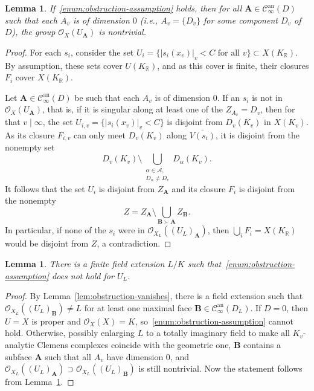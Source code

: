 \documentclass[a4paper, twoside, 10pt]{amsart}
\newcommand{\uA}{{\boldsymbol{A}}}
\newcommand{\uB}{{\boldsymbol{B}}}
\newcommand{\cA}{\mathcal{A}}
\newcommand{\cC}{\mathcal{C}}
\newcommand{\cO}{\mathcal{O}}
\newcommand{\RR}{\mathbb{R}}
\newcommand{\Can}{\cC^{\mathrm{an}}}
\newcommand{\abs}[1]{\left\lvert#1\right\rvert}
\newtheorem{lemma}[theorem]{Lemma}
\theoremstyle{definition}
\begin{document}
\begin{lemma}\label{lem:O-implies-1-dim-obs}
  If~\ref{enum:obstruction-assumption} holds, then for all $\uA\in \Can_\infty(D)$ such that each $A_v$ is of dimension $0$ (i.e., $A_v =\{D_v\}$ for some component $D_v$ of $D$), the group $\cO_{X}(U_{\uA})$ is nontrivial.
\end{lemma}
\begin{proof}
  For each $s_i$, consider the set $U_i = \{\abs{s_i(x_v)}_v < C \text{ for all $v$}\} \subset X(K_\RR)$. By assumption, these sets cover $U(K_\RR)$, and as this cover is finite, their closures $F_i$ cover $X(K_\RR)$.

  Let $\uA\in\Can_\infty(D)$ be such that each $A_v$ is of dimension $0$.
  If an $s_i$ is not in $\cO_{X}(U_{\uA})$, that is, if it is singular along at least one of the $Z_{A_v} = D_v$, then for that $v\mid\infty$,  the set
  $U_{i,v} = \{\abs{s_i(x_v)}_v < C\}$ is disjoint from $D_v(K_v)$ in $X(K_v)$. As its closure $F_{i,v}$ can only meet $D_v(K_v)$ along $\overline{V(s_i)}$, it is disjoint from the nonempty set
  \[
    D_v(K_v)\setminus \bigcup_{\substack{\alpha\in\cA,\\ D_\alpha \ne D_v}} D_\alpha(K_v).
  \]
  It follows that the set $U_i$ is disjoint from $Z_\uA$ and its closure $F_i$ is disjoint from the nonempty
  \[
    Z = Z_\uA \setminus \bigcup_{\uB\succ \uA} Z_\uB.
  \]
  In particular, if none of the $s_i$ were in $\cO_{X_L}((U_L)_{\uA})$, then $\bigcup_i F_i = X(K_\RR)$ would be disjoint from $Z$, a contradiction.
\end{proof}

\begin{lemma}
  There is a finite field extension $L/K$ such that~\ref{enum:obstruction-assumption} does not hold for $U_L$.
\end{lemma}
\begin{proof}
  By Lemma~\ref{lem:obstruction-vanishes}, there is a field extension such that $\cO_{X_L}((U_L)_{\uB}) \ne L$ for at least one maximal face $\uB\in\Can_\infty(D_L)$. 
  If $D=0$, then $U=X$ is proper and $\cO_X(X)=K$, so~\ref{enum:obstruction-assumption} cannot hold. Otherwise, possibly enlarging $L$ to a totally imaginary field to make all $K_v$-analytic Clemens complexes coincide with the geometric one, $\uB$ contains a subface $\uA$ such that all $A_v$ have dimension $0$, and $\cO_{X_L}((U_L)_\uA)\supset \cO_{X_L}((U_L)_\uB)$ is still nontrivial.
  Now the statement follows from Lemma~\ref{lem:O-implies-1-dim-obs}.
\end{proof}
\end{document}
